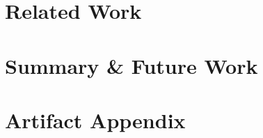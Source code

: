 \documentclass[conference]{IEEEtran}
\begin{document}
%


\section{Related Work}
\label{sec:related}



\section{Summary \& Future Work}
\label{sec:summary}




\appendix
\section{Artifact Appendix}






\end{document}
